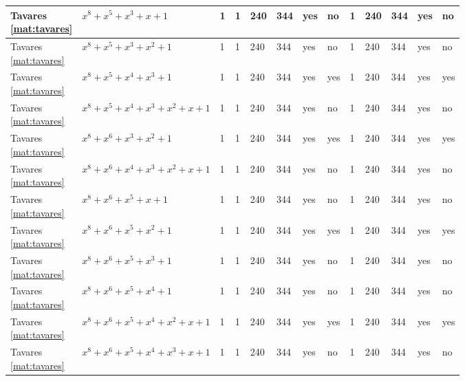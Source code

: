 \begin{tiny}
\begin{longtable}{|l|l|l|l|l|l|l|l|l|l|l|l|l|}
\shortstack{Tavares \\ \eqref{mat:tavares}} & $x^8 + x^5 + x^3 + x + 1$ & 1 & 1 & 240 & 344 & yes & no & 1 & 240 & 344 & yes & no \\ \hline
\shortstack{Tavares \\ \eqref{mat:tavares}} & $x^8 + x^5 + x^3 + x^2 + 1$ & 1 & 1 & 240 & 344 & yes & no & 1 & 240 & 344 & yes & no \\ \hline
\shortstack{Tavares \\ \eqref{mat:tavares}} & $x^8 + x^5 + x^4 + x^3 + 1$ & 1 & 1 & 240 & 344 & yes & yes & 1 & 240 & 344 & yes & yes \\ \hline
\shortstack{Tavares \\ \eqref{mat:tavares}} & $x^8 + x^5 + x^4 + x^3 + x^2 + x + 1$ & 1 & 1 & 240 & 344 & yes & no & 1 & 240 & 344 & yes & no \\ \hline
\shortstack{Tavares \\ \eqref{mat:tavares}} & $x^8 + x^6 + x^3 + x^2 + 1$ & 1 & 1 & 240 & 344 & yes & yes & 1 & 240 & 344 & yes & yes \\ \hline
\shortstack{Tavares \\ \eqref{mat:tavares}} & $x^8 + x^6 + x^4 + x^3 + x^2 + x + 1$ & 1 & 1 & 240 & 344 & yes & no & 1 & 240 & 344 & yes & no \\ \hline
\shortstack{Tavares \\ \eqref{mat:tavares}} & $x^8 + x^6 + x^5 + x + 1$ & 1 & 1 & 240 & 344 & yes & no & 1 & 240 & 344 & yes & no \\ \hline
\shortstack{Tavares \\ \eqref{mat:tavares}} & $x^8 + x^6 + x^5 + x^2 + 1$ & 1 & 1 & 240 & 344 & yes & yes & 1 & 240 & 344 & yes & yes \\ \hline
\shortstack{Tavares \\ \eqref{mat:tavares}} & $x^8 + x^6 + x^5 + x^3 + 1$ & 1 & 1 & 240 & 344 & yes & no & 1 & 240 & 344 & yes & no \\ \hline
\shortstack{Tavares \\ \eqref{mat:tavares}} & $x^8 + x^6 + x^5 + x^4 + 1$ & 1 & 1 & 240 & 344 & yes & no & 1 & 240 & 344 & yes & no \\ \hline
\shortstack{Tavares \\ \eqref{mat:tavares}} & $x^8 + x^6 + x^5 + x^4 + x^2 + x + 1$ & 1 & 1 & 240 & 344 & yes & yes & 1 & 240 & 344 & yes & yes \\ \hline
\shortstack{Tavares \\ \eqref{mat:tavares}} & $x^8 + x^6 + x^5 + x^4 + x^3 + x + 1$ & 1 & 1 & 240 & 344 & yes & no & 1 & 240 & 344 & yes & no \\ \hline

\end{longtable}
\end{tiny}

